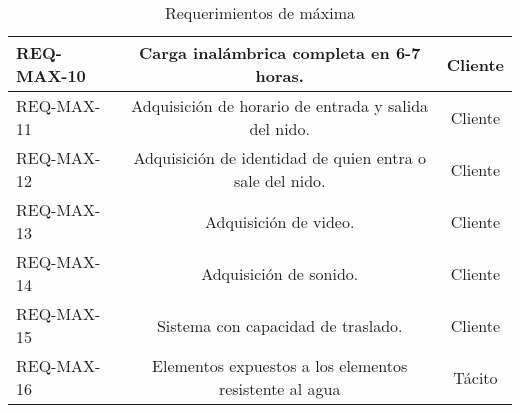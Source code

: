 \begin{table}[H]
\begin{tabular}{|l|c|c|}
REQ-MAX-10                        & Carga inalámbrica completa en 6-7 horas.                                                                                             & Cliente         \\ \hline
REQ-MAX-11                        & Adquisición de horario de entrada y salida del nido.                                                                                 & Cliente         \\ \hline
REQ-MAX-12                        & Adquisición de identidad de quien entra o sale del nido.                                                                             & Cliente         \\ \hline
REQ-MAX-13                        & Adquisición de video.                                                                                                                & Cliente         \\ \hline
REQ-MAX-14                        & Adquisición de sonido.                                                                                                               & Cliente         \\ \hline
REQ-MAX-15                        & Sistema con capacidad de traslado.                                                                                                   & Cliente         \\ \hline
REQ-MAX-16                        & Elementos expuestos a los elementos resistente al agua                                                                               & Tácito          \\ \hline
\end{tabular}
\label{tab:req_max}
\caption{Requerimientos de máxima}
\end{table}